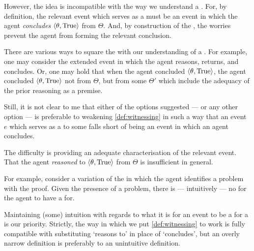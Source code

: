 \begin{note}
  However, the idea is incompatible with the way we understand a .
  For, by definition, the relevant event which serves as a  must be an event in which the agent \emph{concludes} \(\langle \theta, \text{True} \rangle\) from \(\Theta\).
  And, by construction of the , the \agents{} worries prevent the agent from forming the relevant conclusion.

  There are various ways to square the  with our understanding of a .
  For example, one may consider the extended event in which the agent reasons, returns, and concludes.
  Or, one may hold that when the agent concluded \(\langle \theta, \text{True} \rangle\), the agent concluded \(\langle \theta, \text{True} \rangle\) not from \(\Theta\), but from some \pool{} \(\Theta'\) which include the adequacy of the \agents{} prior reasoning as a premise.

  Still, it is not clear to me that either of the options suggested --- or any other option --- is preferable to weakening \autoref{def:witnessing} in such a way that an event \(e\) which serves as a \wit{} to some \ros{} falls short of being an event in which an agent concludes.

  The difficulty is providing an adequate characterisation of the relevant event.
  That the agent \emph{reasoned} to \(\langle \theta, \text{True} \rangle\) from \(\Theta\) is insufficient in general.

  For example, consider a variation of the \scen{} in which the agent identifies a problem with the proof.
  Given the presence of a problem, there is --- intuitively --- no \ros{} for the agent to have a  for.

  Maintaining (some) intuition with regards to what it is for an event to be a  for a  is our priority.
  Strictly, the way in which we put \autoref{def:witnessing} to work is fully compatible with substituting `reasons to' in place of `concludes', but an overly narrow definition is preferably to an unintuitive definition.
\end{note}

\subsection{\supportII{}}
\label{cha:var:ros:II}

